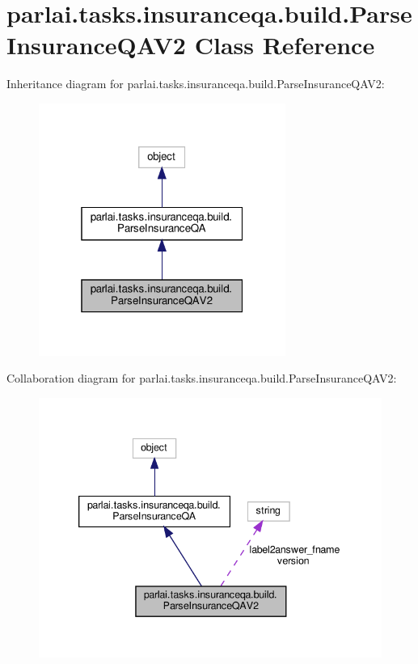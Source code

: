 \hypertarget{classparlai_1_1tasks_1_1insuranceqa_1_1build_1_1ParseInsuranceQAV2}{}\section{parlai.\+tasks.\+insuranceqa.\+build.\+Parse\+Insurance\+Q\+A\+V2 Class Reference}
\label{classparlai_1_1tasks_1_1insuranceqa_1_1build_1_1ParseInsuranceQAV2}


Inheritance diagram for parlai.\+tasks.\+insuranceqa.\+build.\+Parse\+Insurance\+Q\+A\+V2\+:
\nopagebreak
\begin{figure}[H]
\begin{center}
\leavevmode
\includegraphics[width=229pt]{classparlai_1_1tasks_1_1insuranceqa_1_1build_1_1ParseInsuranceQAV2__inherit__graph}
\end{center}
\end{figure}


Collaboration diagram for parlai.\+tasks.\+insuranceqa.\+build.\+Parse\+Insurance\+Q\+A\+V2\+:
\nopagebreak
\begin{figure}[H]
\begin{center}
\leavevmode
\includegraphics[width=339pt]{classparlai_1_1tasks_1_1insuranceqa_1_1build_1_1ParseInsuranceQAV2__coll__graph}
\end{center}
\end{figure}
